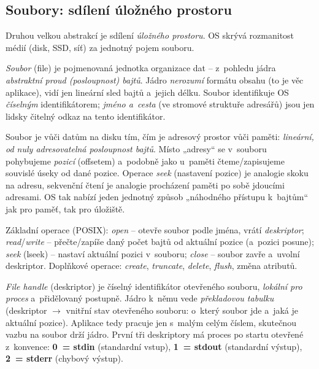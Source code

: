 \subsection{Soubory: sdílení úložného prostoru}

Druhou velkou abstrakcí je sdílení \emph{úložného prostoru}. OS skrývá rozmanitost médií (disk, SSD, síť) za jednotný pojem souboru.

\begin{definice}[Soubor]
\emph{Soubor} (file) je pojmenovaná jednotka organizace dat -- z~pohledu jádra \emph{abstraktní proud (posloupnost) bajtů}. Jádro \emph{nerozumí} formátu obsahu (to je věc aplikace), vidí jen lineární sled bajtů a~jejich délku. Soubor identifikuje OS \emph{číselným} identifikátorem; \emph{jméno a~cesta} (ve stromové struktuře adresářů) jsou jen lidsky čitelný odkaz na tento identifikátor.
\end{definice}

\begin{intuice}
Soubor je vůči datům na disku tím, čím je adresový prostor vůči paměti: \emph{lineární, od nuly adresovatelná posloupnost bajtů}. Místo „adresy`` se v~souboru pohybujeme \emph{pozicí} (offsetem) a~podobně jako u~paměti čteme/zapisujeme souvislé úseky od dané pozice. Operace \emph{seek} (nastavení pozice) je analogie skoku na adresu, sekvenční čtení je analogie procházení paměti po sobě jdoucími adresami. OS tak nabízí jeden jednotný způsob „náhodného přístupu k~bajtům`` jak pro paměť, tak pro úložiště.
\end{intuice}

\begin{definice}
Základní operace (POSIX): \emph{open} -- otevře soubor podle jména, vrátí \emph{deskriptor}; \emph{read}/\emph{write} -- přečte/zapíše daný počet bajtů od aktuální pozice (a~pozici posune); \emph{seek} (lseek) -- nastaví aktuální pozici v~souboru; \emph{close} -- soubor zavře a~uvolní deskriptor. Doplňkové operace: \emph{create}, \emph{truncate}, \emph{delete}, \emph{flush}, změna atributů.
\end{definice}

\begin{definice}
\emph{File handle} (deskriptor) je číselný identifikátor otevřeného souboru, \emph{lokální pro proces} a~přidělovaný postupně. Jádro k~němu vede \emph{překladovou tabulku} (deskriptor $\to$ vnitřní stav otevřeného souboru: o~který soubor jde a~jaká je aktuální pozice). Aplikace tedy pracuje jen s~malým celým číslem, skutečnou vazbu na soubor drží jádro. První tři deskriptory má proces po startu otevřené z~konvence: \textbf{0~= stdin} (standardní vstup), \textbf{1~= stdout} (standardní výstup), \textbf{2~= stderr} (chybový výstup).
\end{definice}

